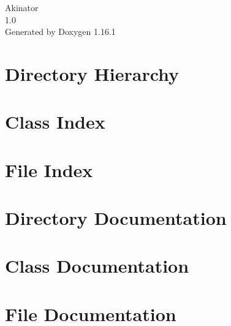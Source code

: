 \documentclass[twoside]{book}
\newcommand{\+}{\discretionary{\mbox{\scriptsize$\hookleftarrow$}}{}{}}
\newcommand{\clearemptydoublepage}{%
    \newpage{\pagestyle{empty}\cleardoublepage}%
  }
\begin{document}
  \raggedbottom
    \hypersetup{pageanchor=false,
                bookmarksnumbered=true,
                pdfencoding=unicode
               }
  \begin{titlepage}
  \vspace*{7cm}
  \begin{center}%
  {\Large Akinator}\\
  [1ex]\large 1.\+0 \\
  \vspace*{1cm}
  {\large Generated by Doxygen 1.16.1}\\
  \end{center}
  \end{titlepage}
  \clearemptydoublepage
  \tableofcontents
  \clearemptydoublepage
  \hypersetup{pageanchor=true}
\chapter{Directory Hierarchy}

\chapter{Class Index}

\chapter{File Index}

\chapter{Directory Documentation}



\chapter{Class Documentation}


\chapter{File Documentation}













  \backmatter
  \newpage
  \clearemptydoublepage
  \printindex
\end{document}
